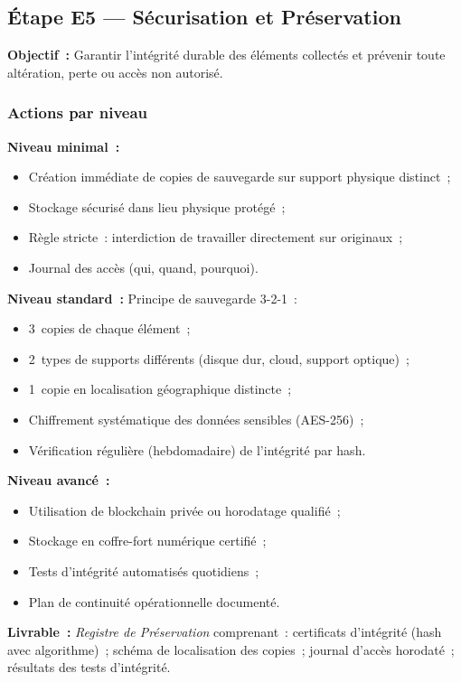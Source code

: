 \subsection{Étape E5 --- Sécurisation et Préservation}

\textbf{Objectif~:} Garantir l'intégrité durable des éléments collectés et
prévenir toute altération, perte ou accès non autorisé.

\subsubsection*{Actions par niveau}

\textbf{Niveau minimal~:}
\begin{itemize}
    \item Création immédiate de copies de sauvegarde sur support physique distinct~;
    \item Stockage sécurisé dans lieu physique protégé~;
    \item Règle stricte~: interdiction de travailler directement sur originaux~;
    \item Journal des accès (qui, quand, pourquoi).
\end{itemize}

\textbf{Niveau standard~:} Principe de sauvegarde 3-2-1~:
\begin{itemize}
    \item 3~copies de chaque élément~;
    \item 2~types de supports différents (disque dur, cloud, support optique)~;
    \item 1~copie en localisation géographique distincte~;
    \item Chiffrement systématique des données sensibles (AES-256)~;
    \item Vérification régulière (hebdomadaire) de l'intégrité par hash.
\end{itemize}

\textbf{Niveau avancé~:}
\begin{itemize}
    \item Utilisation de blockchain privée ou horodatage qualifié~;
    \item Stockage en coffre-fort numérique certifié~;
    \item Tests d'intégrité automatisés quotidiens~;
    \item Plan de continuité opérationnelle documenté.
\end{itemize}

\textbf{Livrable~:} \textit{Registre de Préservation} comprenant~:
certificats d'intégrité (hash avec algorithme)~; schéma de localisation des
copies~; journal d'accès horodaté~; résultats des tests d'intégrité.

